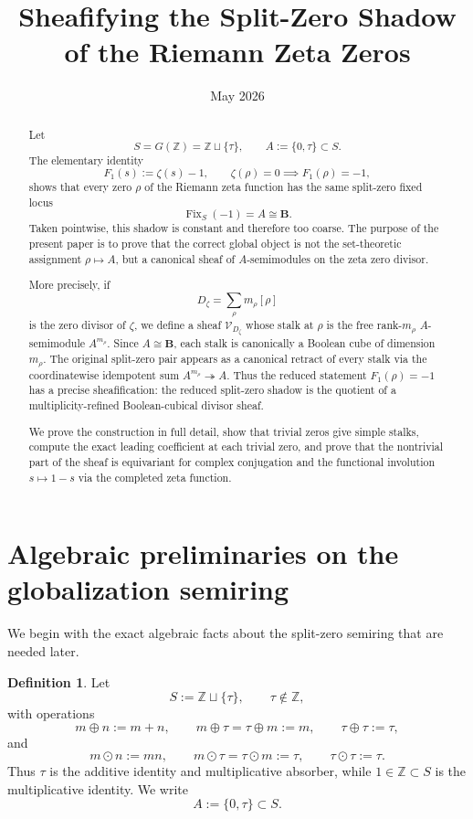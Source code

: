\documentclass[11pt,a4paper]{article}
\title{Sheafifying the Split-Zero Shadow of the Riemann Zeta Zeros}
\author{}
\date{May 2026}
\theoremstyle{definition}
\newtheorem{definition}[theorem]{Definition}
\theoremstyle{remark}
\DeclareMathOperator{\Fix}{Fix}
\newcommand{\ZZ}{\mathbb Z}
\newcommand{\BB}{\mathbf B}
\begin{document}
\maketitle

\begin{abstract}
Let
\[
S=G(\ZZ)=\ZZ\sqcup\{\tau\},\qquad A:=\{0,\tau\}\subset S.
\]
The elementary identity
\[
F_1(s):=\zeta(s)-1,\qquad \zeta(\rho)=0\implies F_1(\rho)=-1,
\]
shows that every zero \(\rho\) of the Riemann zeta function has the same split-zero fixed locus
\[
\Fix_S(-1)=A\cong \BB.
\]
Taken pointwise, this shadow is constant and therefore too coarse. The purpose of the present paper is to prove that the correct global object is not the set-theoretic assignment \(\rho\mapsto A\), but a canonical sheaf of \(A\)-semimodules on the zeta zero divisor.

More precisely, if
\[
D_\zeta=\sum_\rho m_\rho[\rho]
\]
is the zero divisor of \(\zeta\), we define a sheaf \(\mathcal V_{D_\zeta}\) whose stalk at \(\rho\) is the free rank-\(m_\rho\) \(A\)-semimodule \(A^{m_\rho}\). Since \(A\cong\BB\), each stalk is canonically a Boolean cube of dimension \(m_\rho\). The original split-zero pair appears as a canonical retract of every stalk via the coordinatewise idempotent sum \(A^{m_\rho}\twoheadrightarrow A\). Thus the reduced statement \(F_1(\rho)=-1\) has a precise sheafification: the reduced split-zero shadow is the quotient of a multiplicity-refined Boolean-cubical divisor sheaf.

We prove the construction in full detail, show that trivial zeros give simple stalks, compute the exact leading coefficient at each trivial zero, and prove that the nontrivial part of the sheaf is equivariant for complex conjugation and the functional involution \(s\mapsto 1-s\) via the completed zeta function.
\end{abstract}

\tableofcontents

\section{Algebraic preliminaries on the globalization semiring}

We begin with the exact algebraic facts about the split-zero semiring that are needed later.

\begin{definition}
Let
\[
S:=\ZZ\sqcup\{\tau\},\qquad \tau\notin\ZZ,
\]
with operations
\[
m\oplus n:=m+n,
\qquad
m\oplus \tau=\tau\oplus m:=m,
\qquad
\tau\oplus\tau:=\tau,
\]
and
\[
m\odot n:=mn,
\qquad
m\odot\tau=\tau\odot m:=\tau,
\qquad
\tau\odot\tau:=\tau.
\]
Thus \(\tau\) is the additive identity and multiplicative absorber, while \(1\in\ZZ\subset S\) is the multiplicative identity. We write
\[
A:=\{0,\tau\}\subset S.
\]
\end{definition}
\end{document}
